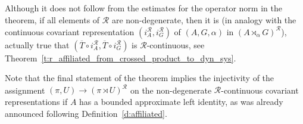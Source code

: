 \documentclass{amsart}
\theoremstyle{plain}
\theoremstyle{definition}
\numberwithin{equation}{section}
\begin{document}
Although it does not follow from the estimates for the operator norm in the theorem, if all elements of ${\mathcal R}$ are non-degenerate, then it is (in analogy with the continuous covariant representation $(i_A^{\mathcal R}, i_G^{\mathcal R})$ of ${(A,G,\alpha)}$ in ${(A {\rtimes}_\alpha G)^\mathcal{R}}$), actually true that $(\overline{T} \circ i_A^{\mathcal R}, \overline{T} \circ i_G^{\mathcal R})$ is ${\mathcal R}$-continuous, see Theorem~\ref{t:r_affiliated_from_crossed_product_to_dyn_sys}.

Note that the final statement of the theorem implies the injectivity of the assignment ${(\pi,U)}\to ({\pi \rtimes U})^{\mathcal R}$ on the non-degenerate ${\mathcal R}$-continuous covariant representations if $A$ has a bounded approximate left identity, as was already announced following Definition~\ref{d:affiliated}.
\end{document}
